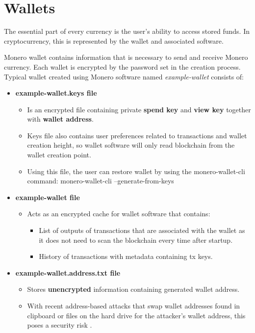 \documentclass[
  printed, %
  table,   %
  nolof,     %
  nolot,     %
           oneside, color
]{fithesis3}
\begin{document}
\section{Wallets}
\label{sec:wallets}
The essential part of every currency is the user's ability to access stored funds. In cryptocurrency, this is represented by the wallet and associated software.

Monero wallet contains information that is necessary to send and receive Monero currency. Each wallet is encrypted by the password set in the creation process. Typical wallet created using Monero software named \textit{example-wallet} consists of:
\begin{itemize}\itemsep0em
\item \textbf{example-wallet.keys file}
\begin{itemize}\itemsep0em
\item Is an encrypted file containing private \textbf{spend key} and \textbf{view key} together with \textbf{wallet address}.
\item Keys file also contains user preferences related to transactions and wallet creation height, so wallet software will only read blockchain from the wallet creation point.
\item Using this file, the user can restore wallet by using the monero-wallet-cli command: monero-wallet-cli --generate-from-keys
\end{itemize}
\item \textbf{example-wallet file}
\begin{itemize}\itemsep0em
\item Acts as an encrypted cache for wallet software that contains:
\begin{itemize}\itemsep0em
\item List of outputs of transactions that are associated with the wallet as it does not need to scan the blockchain every time after startup.
\item History of transactions with metadata containing tx keys.
\end{itemize}
\end{itemize}
\item \textbf{example-wallet.address.txt file}
\begin{itemize}\itemsep0em
\item Stores \textbf{unencrypted} information containing generated wallet address.
\item With recent address-based attacks that swap wallet addresses found in clipboard or files on the hard drive for the attacker's wallet address, this poses a security risk \cite{cryptoshuffler}.

\end{itemize}
\end{itemize}
\end{document}
